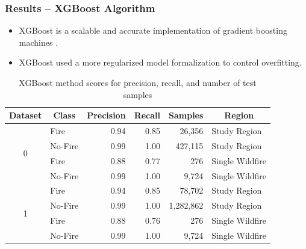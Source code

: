 \documentclass{beamer}
\begin{document}
\begin{frame}
  \frametitle{Results -- XGBoost Algorithm}
  \scriptsize
   \begin{itemize}
 \item XGBoost is a scalable and accurate implementation of gradient boosting 
machines \citep{Chen:2016}.
 \item  XGBoost used a more regularized model formalization to control 
overfitting.

 \end{itemize}


 
\begin{table}
\centering
   \caption{XGBoost method scores for precision, recall, and number of test 
samples}
    \label{tbl:xgb_results}
\begin{tabular}{c l r r r l}
 \toprule
 \multicolumn{1}{c}{Dataset} & \multicolumn{1}{c}{Class} & 
\multicolumn{1}{c}{Precision} & \multicolumn{1}{c}{Recall} & 
\multicolumn{1}{c}{Samples} & \multicolumn{1}{c}{Region} \\
 \midrule
\multirow{4}{*}{0} 
 & Fire & 0.94 & 0.85  & 26,356 & Study Region\\
 & No-Fire & 0.99 & 1.00 & 427,115 & Study Region\\ 
 
 & Fire & 0.88 & 0.77  & 276 & Single Wildfire\\
 & No-Fire & 0.99 & 1.00 & 9,724 & Single Wildfire\\ 
 \midrule
\multirow{4}{*}{1} 
 & Fire & 0.94 & 0.85 & 78,702 & Study Region\\
 & No-Fire & 0.99 & 1.00 & 1,282,862 & Study Region\\ 
 
 & Fire & 0.88 & 0.76 & 276 & Single Wildfire\\
 & No-Fire & 0.99 & 1.00 & 9,724 & Single Wildfire\\ 
 \bottomrule
\end{tabular}
\end{table}


\end{frame}  
\end{document}
